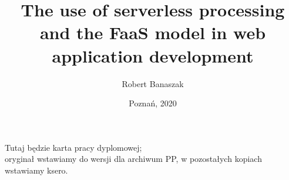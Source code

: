 \documentclass[11pt,a4paper,english,thesis]{dcsbook}
\begin{document}
\author{Robert Banaszak}
\title{The use of serverless processing and the FaaS model in web application development}
\date{Poznań, 2020}
\maketitle
\frontmatter

\thispagestyle{empty}\vspace*{\fill}%
\begin{center}Tutaj będzie karta pracy dyplomowej;\\oryginał wstawiamy do wersji dla archiwum PP, w pozostałych kopiach wstawiamy ksero.\end{center}%
\vfill\cleardoublepage%

\tableofcontents{}
\mainmatter







\backmatter

{\raggedright\sloppy\small}
\end{document}
